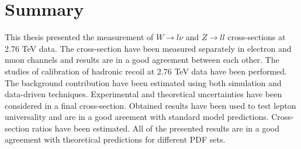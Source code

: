 \chapter{Summary}
This thesis presented the measurement of $W\to l\nu$ and $Z\to ll$ cross-sections at 2.76 TeV data. The cross-section have been measured separately in electron and muon channels and results are in a good agreement between each other.
The studies of calibration of hadronic recoil at 2.76 TeV data have been performed. The background contribution have been estimated using both simulation and data-driven techniques.
Experimental and theoretical uncertainties have been considered in a final cross-section. 
Obtained results have been used to test lepton universality and are in a good areement with standard model predictions.
Cross-section ratios have been estimated. All of the presented results are in a good agreement with theoretical predictions for different PDF sets.